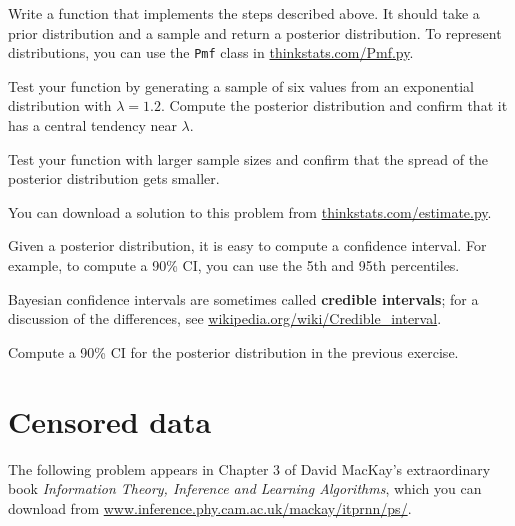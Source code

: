\documentclass[12pt]{book}
\begin{document}
\begin{ex}

Write a function that implements the steps described above.  It should
take a prior distribution and a sample and return a posterior distribution.
To represent distributions, you can use
the {\tt Pmf} class in \url{thinkstats.com/Pmf.py}.

Test your function by generating a sample of six values from an
exponential distribution with $\lambda = 1.2$.  Compute the posterior
distribution and confirm that it has a central tendency near $\lambda$.

Test your function with larger sample sizes and confirm that the
spread of the posterior distribution gets smaller.

You can download a solution to this problem from
\url{thinkstats.com/estimate.py}.

\end{ex}

\begin{ex}

Given a posterior distribution, it is easy to compute a confidence
interval.  For example, to compute a 90\% CI, you can
use the 5th and 95th percentiles.

Bayesian confidence intervals are sometimes called {\bf credible
intervals}; for a discussion of the differences, see
\url{wikipedia.org/wiki/Credible_interval}.

Compute a 90\% CI for the posterior distribution in the previous
exercise.

\end{ex}







\section{Censored data}
\label{censored}

The following problem appears in Chapter 3 of David MacKay's
extraordinary book {\em Information Theory, Inference and Learning
  Algorithms}, which you can download from
\url{www.inference.phy.cam.ac.uk/mackay/itprnn/ps/}.
\end{document}
